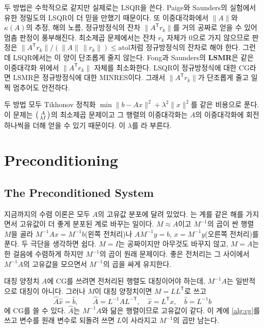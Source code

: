 두 방법은 수학적으로 같지만 실제로는 LSQR을 쓴다. Paige와 Saunders의 실험에서 유한 정밀도의 LSQR이 더 믿을 만했기 때문이다. 또 이중대각화에서 $\|A\|$와 $\kappa(A)$의 추정, 해의 노름, 정규방정식의 잔차 $\|A^{\mathsf T}r_k\|$를 거의 공짜로 얻을 수 있어 멈춤 판정이 풍부해진다. 최소제곱 문제에서는 잔차 $r_k$ 자체가 $0$으로 가지 않으므로 판정은 $\|A^{\mathsf T}r_k\|/(\|A\|\,\|r_k\|)\le\mathrm{atol}$처럼 정규방정식의 잔차로 해야 한다. 그런데 LSQR에서는 이 양이 단조롭게 줄지 않는다. Fong과 Saunders의 \textbf{LSMR}은 같은 이중대각화 위에서 $\|A^{\mathsf T}r_k\|$ 자체를 최소화한다\cite{fong2011lsmr}. LSQR이 정규방정식에 대한 CG라면 LSMR은 정규방정식에 대한 MINRES이다. 그래서 $\|A^{\mathsf T}r_k\|$가 단조롭게 줄고 일찍 멈추어도 안전하다.

두 방법 모두 Tikhonov 정칙화 $\min\|b-Ax\|^2+\lambda^2\|x\|^2$를 같은 비용으로 푼다. 이 문제는 $\begin{psmallmatrix}A\\\lambda I\end{psmallmatrix}$의 최소제곱 문제이고 그 행렬의 이중대각화는 $A$의 이중대각화에 회전 하나씩을 더해 얻을 수 있기 때문이다. 이 $\lambda$를 라 부른다.

\section{Preconditioning}
\label{sec:preconditioning}

\subsection{The Preconditioned System}

지금까지의 수렴 이론은 모두 $A$의 고유값 분포에 달려 있었다. 는 계를 같은 해를 가지면서 고유값이 더 좋게 분포된 계로 바꾸는 일이다. $M\approx A$이고 $M^{-1}$의 곱이 싼 행렬 $M$을 골라 $M^{-1}Ax=M^{-1}b$(왼쪽 전처리)나 $AM^{-1}y=b$, $x=M^{-1}y$(오른쪽 전처리)를 푼다. 두 극단을 생각하면 쉽다. $M=I$는 공짜이지만 아무것도 바꾸지 않고, $M=A$는 한 걸음에 수렴하게 하지만 $M^{-1}$의 곱이 원래 문제이다. 좋은 전처리는 그 사이에서 $M^{-1}A$의 고유값을 모으면서 $M^{-1}$의 곱을 싸게 유지한다.

대칭 양정치 $A$에 CG를 쓰려면 전처리된 행렬도 대칭이어야 하는데, $M^{-1}A$는 일반적으로 대칭이 아니다. 그러나 $M$이 대칭 양정치이면 $M=LL^{\mathsf T}$로 쓰고 
\[
\hat A\hat x=\hat b,\qquad\hat A=L^{-1}AL^{-\mathsf T},\quad\hat x=L^{\mathsf T}x,\quad\hat b=L^{-1}b
\]
에 CG를 쓸 수 있다. $\hat A$는 $M^{-1}A$와 닮은 행렬이므로 고유값이 같다. 이 계에 \cref{alg:cg}를 쓰고 변수를 원래 변수로 되돌려 쓰면 $L$이 사라지고 $M^{-1}$의 곱만 남는다.

